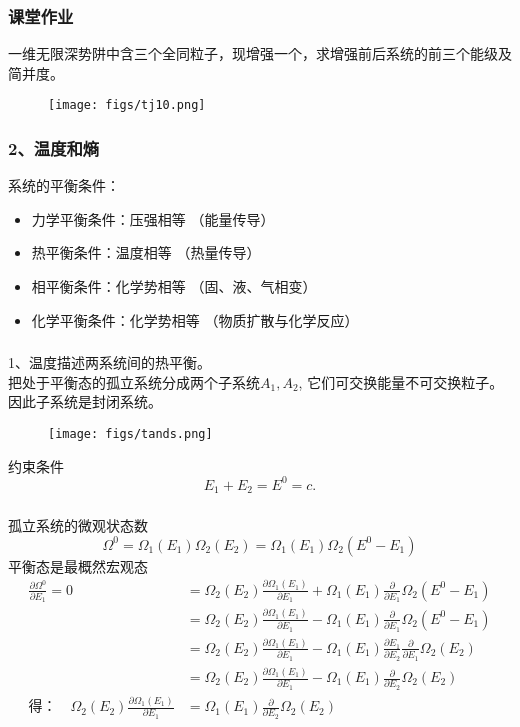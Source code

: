 \begin{frame}[label=current]
  \frametitle{课堂作业}
一维无限深势阱中含三个全同粒子，现增强一个，求增强前后系统的前三个能级及简并度。
\begin{figure}[htbp]
  \centering
  \texttt{[image: figs/tj10.png]}
\end{figure}
\end{frame} 

\begin{frame}
  \frametitle{ 2、温度和熵 }
  系统的平衡条件：
  \begin{itemize}
    \item 力学平衡条件：压强相等 （能量传导）
    \item 热平衡条件：温度相等 （热量传导）
    \item 相平衡条件：化学势相等 （固、液、气相变）
    \item 化学平衡条件：化学势相等 （物质扩散与化学反应）
  \end{itemize}
\end{frame} 


\begin{frame}[label=current]
  \frametitle{}
  1、温度描述两系统间的热平衡。\\
  把处于平衡态的孤立系统分成两个子系统$A_1, A_2$, 它们可交换能量不可交换粒子。因此子系统是封闭系统。
  \begin{figure}[htbp]
    \centering
    \texttt{[image: figs/tands.png]}
  \end{figure}
  约束条件
  \[ E_1 + E_2 = E^0 =c.\]
\end{frame} 

\begin{frame}
  \frametitle{}
  孤立系统的微观状态数
  \[ \Omega^0 = \Omega _1 (E_1)\Omega _2 (E_2) = \Omega _1 (E_1)\Omega _2 (E^0 - E_1) \]
  平衡态是最概然宏观态
  \[ 
  \begin{aligned}
   \frac{\partial \Omega^0 }{\partial E_1 } =0 &= \Omega _2 (E_2) \frac{\partial \Omega _1 (E_1) }{\partial E_1 }  + \Omega _1 (E_1)\frac{\partial }{\partial E_1 }\Omega _2 (E^0 - E_1) \\
   &= \Omega _2 (E_2) \frac{\partial \Omega _1 (E_1) }{\partial E_1 }  - \Omega _1 (E_1)\frac{\partial }{\partial E_1 }\Omega _2 (E^0 - E_1) \\
   &= \Omega _2 (E_2) \frac{\partial \Omega _1 (E_1) }{\partial E_1 }  - \Omega _1 (E_1) \frac{\partial E_1 }{\partial E_2 } \frac{\partial }{\partial E_1 }\Omega _2 (E_2)  \\
   &=  \Omega _2 (E_2) \frac{\partial \Omega _1 (E_1) }{\partial E_1 }  - \Omega _1 (E_1) \frac{\partial }{\partial E_2 }\Omega _2 (E_2)  \\
  \text{得：} \quad \Omega _2 (E_2) \frac{\partial \Omega _1 (E_1) }{\partial E_1 }  &= \Omega _1 (E_1) \frac{\partial }{\partial E_2 }\Omega _2 (E_2) 
  \end{aligned}\]
\end{frame} 

